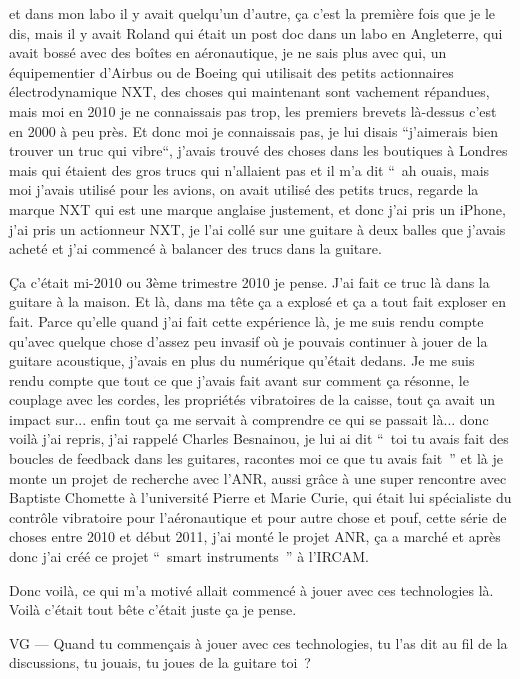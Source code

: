 et dans mon labo il y avait quelqu'un d'autre, ça c'est la première fois que je le dis, mais il y avait Roland qui était un post doc dans un labo en Angleterre, qui avait bossé avec des boîtes en aéronautique, je ne sais plus avec qui, un équipementier d'Airbus ou de Boeing qui utilisait des petits actionnaires électrodynamique NXT, des choses qui maintenant sont vachement répandues, mais moi en 2010 je ne connaissais pas trop, les premiers brevets là-dessus c'est en 2000 à peu près. Et donc moi je connaissais pas, je lui disais “j'aimerais bien trouver un truc qui vibre“, j'avais trouvé des choses dans les boutiques à Londres mais qui étaient des gros trucs qui n'allaient pas et il m'a dit “ ah ouais, mais moi j'avais utilisé pour les avions, on avait utilisé des petits trucs, regarde la marque NXT qui est une marque anglaise justement, et donc j'ai pris un iPhone, j'ai pris un actionneur NXT, je l'ai collé sur une guitare à deux balles que j'avais acheté et j'ai commencé à balancer des trucs dans la guitare. 

Ça c'était mi-2010 ou 3ème trimestre 2010 je pense. J'ai fait ce truc là dans la guitare à la maison. Et là, dans ma tête ça a explosé et ça a tout fait exploser en fait. Parce qu'elle quand j'ai fait cette expérience là, je me suis rendu compte qu'avec quelque chose d'assez peu invasif où je pouvais continuer à jouer de la guitare acoustique, j'avais en plus du numérique qu'était dedans. Je me suis rendu compte que tout ce que j'avais fait avant sur comment ça résonne, le couplage avec les cordes, les propriétés vibratoires de la caisse, tout ça avait un impact sur... enfin tout ça me servait à comprendre ce qui se passait là... donc voilà j'ai repris, j'ai rappelé Charles Besnainou, je lui ai dit “ toi tu avais fait des boucles de feedback dans les guitares, racontes moi ce que tu avais fait ” et là je monte un projet de recherche avec l'ANR, aussi grâce à une super rencontre avec Baptiste Chomette à l'université Pierre et Marie Curie, qui était lui spécialiste du contrôle vibratoire pour l'aéronautique et pour autre chose et pouf, cette série de choses entre 2010 et début 2011, j'ai monté le projet ANR, ça a marché et après donc j'ai créé ce projet “ smart instruments ” à l'IRCAM. 

Donc voilà, ce qui m'a motivé allait commencé à jouer avec ces technologies là. Voilà c'était tout bête c'était juste ça je pense. 

VG — Quand tu commençais à jouer avec ces technologies, tu l'as dit au fil de la discussions, tu jouais, tu joues de la guitare toi ? 

